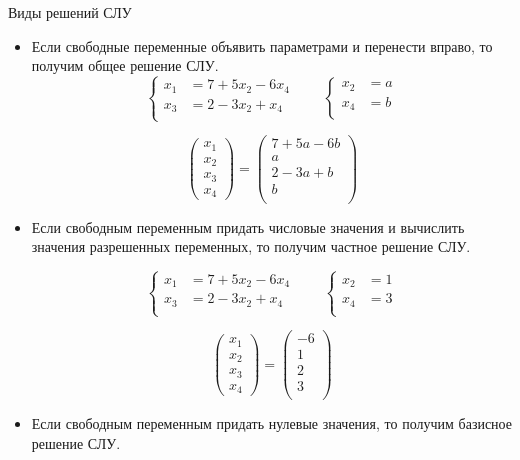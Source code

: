 \documentclass[unicode,11pt,notheorems]{beamer}
\begin{document}
\begin{frame}[allowframebreaks]{Виды решений СЛУ}{}
%
	\begin{itemize}
	\item 
		Если свободные переменные объявить параметрами и перенести вправо, то получим \alert{общее решение СЛУ}.
		$$	
		\left\lbrace
		\begin{aligned}
			x_1 &= 7+ 5x_2 - 6x_4\\
			x_3 &= 2-3x_2 + x_4\\
		\end{aligned}
		\right.
		\qquad 
		\left\lbrace
		\begin{aligned}
			x_2 &= a\\
			x_4 &= b\\
		\end{aligned}
		\right.
		$$
		
		$$
		\begin{pmatrix}
			x_1 \\ x_2\\ x_3\\ x_4
		\end{pmatrix}
		= 
		\begin{pmatrix}
			7+5a-6b\\
			a\\
			2-3a+b\\
			b\\
		\end{pmatrix}
		$$
	\framebreak
	\item 
		Если свободным переменным придать числовые значения и вычислить значения разрешенных переменных, то получим \alert{частное решение СЛУ}.

		$$	
		\left\lbrace
		\begin{aligned}
			x_1 &= 7+ 5x_2 - 6x_4\\
			x_3 &= 2-3x_2 + x_4\\
		\end{aligned}
		\right.
		\qquad 
		\left\lbrace
		\begin{aligned}
				x_2 &= 1\\
				x_4 &= 3\\
		\end{aligned}
		\right.
		$$

		$$
		\begin{pmatrix}
			x_1 \\ x_2\\ x_3\\ x_4
		\end{pmatrix}
		= 
		\begin{pmatrix}
			-6\\
			1\\
			2\\
			3\\
		\end{pmatrix}
		$$		
	\item 
		Если свободным переменным придать нулевые значения, то получим \alert{базисное решение СЛУ}.


\end{itemize}
\end{frame}
\end{document}
